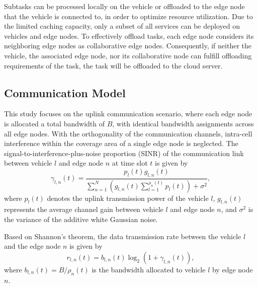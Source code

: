 \documentclass[lettersize,journal]{IEEEtran}
\begin{document}
Subtasks can be processed locally on the vehicle or offloaded to the edge node that the vehicle is connected to, in order to optimize resource utilization. 
Due to the limited caching capacity, only a subset of all services can be deployed on vehicles and edge nodes.
To effectively offload tasks, each edge node considers its neighboring edge nodes as collaborative edge nodes.
Consequently, if neither the vehicle, the associated edge node, nor its collaborative node can fulfill  offloading requirements of the task, the task will be offloaded to the cloud server. 


\subsection{Communication Model} \label{Communication Model} 
This study focuses on the uplink communication scenario, where each edge node is allocated a total bandwidth of $B$, with identical bandwidth assignments across all edge nodes. With the orthogonality of the communication channels, intra-cell interference within the coverage area of a single edge node is neglected.
The signal-to-interference-plus-noise proportion (SINR) of the communication link between vehicle $l$ and edge node $n$ at time slot $t$ is given by
\begin{equation}
	\label{euq: SINR}
	\gamma_{l,n}(t) =\frac{p_{l}(t)g_{l,n}(t)}{\sum_{n=1}^{N} \left(g_{l,n}(t)\sum_{l=1}^{\rho_{n}(t)}p_{l}(t)\right) + \sigma ^2},
\end{equation}
where $p_{l}(t)$ denotes the uplink transmission power of the vehicle $ l $, $g_{l,n}(t)$ represents the average channel gain between vehicle $l$ and edge node $n$, and $\sigma^2$ is the variance of the additive white Gaussian noise. 

Based on Shannon's theorem, the data transmission rate between the vehicle $ l $ and the edge node $ n $ is given by
\begin{equation}
	\label{equ: ransimission rate}
	r_{l,n}(t) = b_{l,n}(t)\log_2( 1+\gamma_{l,n}(t) ),
\end{equation}
where $ b_{l,n}(t) = B/\rho_{n}(t) $ is the bandwidth allocated to vehicle $ l $ by edge node $ n $.
\end{document}
